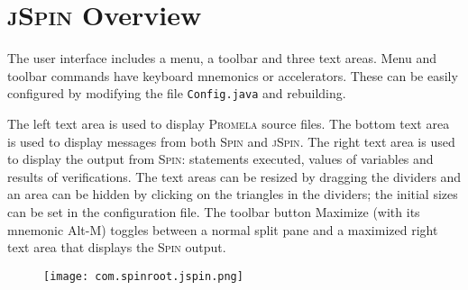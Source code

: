 \documentclass[11pt]{article}
\newcommand{\spn}{\textsc{Spin}}
\newcommand{\prm}{\textsc{Promela}}
\newcommand{\js}{\textsc{jSpin}}
\newcommand{\p}[1]{\texttt{#1}}
\newcommand{\bu}[1]{\textsf{#1}}
\begin{document}
\section{\js{} Overview}
The user interface includes a menu, a toolbar and three text areas.
Menu and toolbar commands have keyboard mnemonics or accelerators.
These can be easily configured by modifying the file \p{Config.java} and
rebuilding.

The left text area is used to display \prm{} source files. The bottom
text area is used to display messages from both \spn{} and \js{}. The
right text area is used to display the output from \spn{}: statements
executed, values of variables and results of verifications. The text
areas can be resized by dragging the dividers and an area can be hidden
by clicking on the triangles in the dividers; the initial sizes can be
set in the configuration file. The toolbar button \bu{Maximize} (with
its mnemonic \bu{Alt-M}) toggles between a normal split pane and a
maximized right text area that displays the \spn{} output.

\begin{figure}[tb]
\begin{center}
\texttt{[image: com.spinroot.jspin.png]}
\end{center}
\end{figure}
\end{document}
